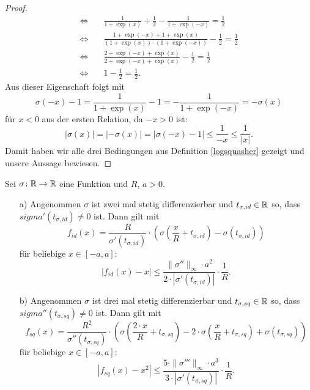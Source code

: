 \begin{proof}
\begin{equation*}
\begin{split}
 \Leftrightarrow  & \quad \frac{1}{1 + \exp(x)} + \frac{1}{2} -\frac{1}{1 + \exp(-x)} = \frac{1}{2}\\
 \Leftrightarrow & \quad  \frac{1 + \exp(-x) + 1 + \exp(x)}{(1 + \exp(x)) \cdot (1 + \exp(-x))} - \frac{1}{2} = \frac{1}{2} \\
 \Leftrightarrow & \quad \frac{2 + \exp(-x) + \exp(x)}{2 + \exp(-x) + \exp(x)} - \frac{1}{2} = \frac{1}{2} \\
 \Leftrightarrow & \quad 1 - \frac{1}{2} = \frac{1}{2}.
\end{split}
\end{equation*}
Aus dieser Eigenschaft folgt mit $$\sigma(- x) - 1 = \frac{1}{1 + \exp(x)} - 1 = -\frac{1}{1 + \exp(-x)} = -\sigma(x)$$ für $x < 0$ aus der ersten Relation, da $-x > 0 $ ist$\colon$  
$$|\sigma(x)| = |-\sigma(x)| = |\sigma(- x) - 1| \leq \frac{1}{-x} \leq \frac{1}{|x|}.$$
Damit haben wir alle drei Bedingungen aus Definition \ref{logsquasher} gezeigt und unsere Aussage bewiesen.
\end{proof}
\begin{lem}
  \label{lem:1}
  Sei $\sigma \colon \mathbb{R} \to \mathbb{R}$ eine Funktion und $R$, $a > 0$.
  \begin{itemize}
  \item[a)] Angenommen $\sigma$ ist zwei mal stetig differenzierbar und $t_{\sigma,id} \in \mathbb{R}$ so, dass $sigma'(t_{\sigma, id}) \neq 0$ ist. Dann gilt mit
  $$ f_{id}(x) = \frac{R}{\sigma'(t_{\sigma, id})} \cdot \left(\sigma\left(\frac{x}{R} + t_{\sigma, id}\right) - \sigma(t_{\sigma, id})\right)$$
  für beliebige $x \in [-a, a]\colon$ 
  $$ |f_{id}(x) - x| \leq \frac{\|\sigma''\|_{\infty} \cdot a^2}{2 \cdot |\sigma'(t_{\sigma, id})|} \cdot \frac{1}{R}.$$
  \item[b)] Angenommen $\sigma$ ist drei mal stetig differenzierbar und $t_{\sigma,sq} \in \mathbb{R}$ so, dass $sigma''(t_{\sigma, sq}) \neq 0$ ist. Dann gilt mit
  $$ f_{sq}(x) = \frac{R^2}{\sigma''(t_{\sigma, sq})} \cdot \left(\sigma\left(\frac{2 \cdot x}{R} + t_{\sigma, sq}\right) - 2 \cdot \sigma(\frac{x}{R} + t_{\sigma, sq})+ \sigma(t_{\sigma, sq})\right)$$
  für beliebige $x \in [-a, a]\colon$ 
  $$ |f_{sq}(x) - x^2| \leq \frac{5 \cdot \|\sigma'''\|_{\infty} \cdot a^3}{3 \cdot |\sigma'(t_{\sigma, sq})|} \cdot \frac{1}{R}.$$
  \end{itemize}
\end{lem}
